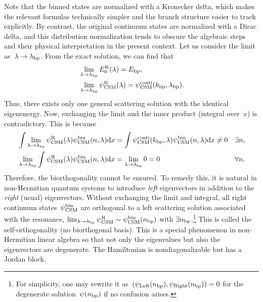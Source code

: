 Note that the binned states are normalized with a Kronecker delta, which makes the relevant formulas technically simpler and the branch structure easier to track explicitly. By contrast, the original continuum states are normalized with a Dirac delta, and this distribution normalization tends to obscure the algebraic steps and their physical interpretation in the present context.
Let us consider the limit as~$\lambda\to\lambda_{\mathrm{bp}}$.
From the exact solution, we can find that
\begin{align}
    &\lim_{\lambda\to\lambda_{\mathrm{bp}}} E_0^{\mathrm{R}}(\lambda)
    = E_{\mathrm{bp}} ,\\
    &\lim_{\lambda\to\lambda_{\mathrm{bp}}} \psi^{\mathrm{R}}_{\mathrm{CSM}}(\lambda)
    = \psi^{\mathrm{conti}}_{\mathrm{CSM}}(k_{\mathrm{bp}},\lambda_{\mathrm{bp}}).
    \label{src:2512_24528:eq:lim_res_is_conti}
\end{align}
Thus, there exists only one general scattering solution with the identical eigenenergy.
Now, exchanging the limit and the inner product (integral over~$x$) is contradictory.
This is because
\begin{align}
    &\int \lim_{\lambda\to\lambda_{\mathrm{bp}}}\psi^{\mathrm{R}}_{\mathrm{CSM}}(\lambda) \psi^{\mathrm{bin}}_{\mathrm{CSM}}(n,\lambda) \mathrm{d} x
    = \int \psi^{\mathrm{conti}}_{\mathrm{CSM}}(k_{\mathrm{bp}},\lambda) \psi^{\mathrm{bin}}_{\mathrm{CSM}}(n,\lambda) \mathrm{d} x \neq 0
    &&
    \text{$\exists n$} ,\\
    &\lim_{\lambda\to\lambda_{\mathrm{bp}}}\int \psi^{\mathrm{R}}_{\mathrm{CSM}}(\lambda) \psi^{\mathrm{bin}}_{\mathrm{CSM}}(n,\lambda) \mathrm{d} x
    = \lim_{\lambda\to\lambda_{\mathrm{bp}}} 0 = 0
    &&
    \text{$\forall n$} .
\end{align}
Therefore, the biorthogonality cannot be ensured.
To remedy this, it is natural in non-Hermitian quantum systems to introduce \textit{left} eigenvectors in addition to the \textit{right} (usual) eigenvectors.
Without exchanging the limit and integral, all right continuum states~$\psi^{\mathrm{bin}}_{\mathrm{CSM}}$ are orthogonal to a left scattering solution associated with the resonance, $\lim_{\lambda\to\lambda_{\mathrm{bp}}}\psi^{\mathrm{R}}_{\mathrm{CSM}}\sim\psi^{\mathrm{bin}}_{\mathrm{CSM}}(n_{\mathrm{bp}})$ with $\exists n_{\mathrm{bp}}$.\footnote{For simplicity, one may rewrite it as~$(\psi_{\mathrm{Left}}(n_{\mathrm{bp}}),\psi_{\mathrm{Right}}(n_{\mathrm{bp}}))=0$ for the degenerate solution~$\psi(n_{\mathrm{bp}})$ if no confusion arises.}
This is called the self-orthogonality (no biorthogonal basis).
This is a special phenomenon in non-Hermitian linear algebra so that not only the eigenvalues but also the eigenvectors are degenerate.
The Hamiltonian is nondiagonalizable but has a Jordan block.
